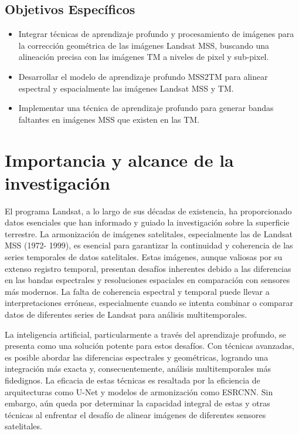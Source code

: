             \subsection{Objetivos Específicos}
                \begin{itemize}
                    \item[-] Integrar técnicas de aprendizaje profundo y procesamiento de imágenes para la corrección geométrica de las imágenes Landsat MSS, buscando una alineación precisa con las imágenes TM a niveles de pixel y sub-pixel.
                    \item[-] Desarrollar el modelo de aprendizaje profundo MSS2TM para alinear espectral y espacialmente las imágenes Landsat MSS y TM.
                    \item[-] Implementar una técnica de aprendizaje profundo para generar bandas faltantes en imágenes MSS que existen en las TM.
                \end{itemize}

    \section{Importancia y alcance de la investigación}
        El programa Landsat, a lo largo de sus décadas de existencia, ha proporcionado datos esenciales que han informado y guiado la investigación sobre la superficie terrestre. La armonización de imágenes satelitales, especialmente las de Landsat MSS (1972- 1999), es esencial para garantizar la continuidad y coherencia de las series temporales de datos satelitales. Estas imágenes, aunque valiosas por su extenso registro temporal, presentan desafíos inherentes debido a las diferencias en las bandas espectrales y resoluciones espaciales en comparación con sensores más modernos. La falta de coherencia espectral y temporal puede llevar a interpretaciones erróneas, especialmente cuando se intenta combinar o comparar datos de diferentes series de Landsat para análisis multitemporales.
        
        La inteligencia artificial, particularmente a través del aprendizaje profundo, se presenta como una solución potente para estos desafíos. Con técnicas avanzadas, es posible abordar las diferencias espectrales y geométricas, logrando una integración más exacta y, consecuentemente, análisis multitemporales más fidedignos. La eficacia de estas técnicas es resaltada por la eficiencia de arquitecturas como U-Net y modelos de armonización como ESRCNN. Sin embargo, aún queda por determinar la capacidad integral de estas y otras técnicas al enfrentar el desafío de alinear imágenes de diferentes sensores satelitales.
        
